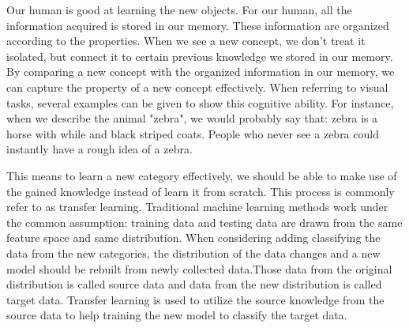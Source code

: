 Our human is good at learning the new objects. For our human, all the information acquired is stored in our memory. These information are organized according to the properties. When we see a new concept, we don't treat it isolated, but connect it to certain previous knowledge we stored in our memory. By comparing a new concept with the organized information in our memory, we can capture the property of a new concept effectively. When referring to visual tasks, several examples can be given to show this cognitive ability. For instance, when we describe the animal "zebra", we would probably say that: zebra is a horse with while and black striped coats. People who never see a zebra could instantly have a rough idea of a zebra. 

This means to learn a new category effectively, we should be able to make use of the gained knowledge instead of learn it from scratch. This process is commonly refer to as transfer learning. Traditional machine learning methods work under the common assumption: training data and testing data are drawn from the same feature space and same distribution. When considering adding classifying the data from the new categories, the distribution of the data changes and a new model should be rebuilt from newly collected data.Those data from the original distribution is called source data and data from the new distribution is called target data. Transfer learning is used to utilize the source knowledge from the source data to help training the new model to classify the target data. 

